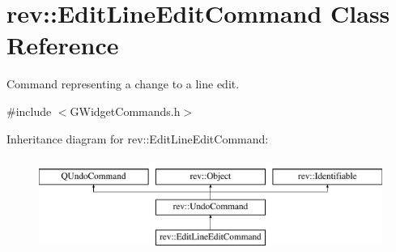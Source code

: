 \hypertarget{classrev_1_1_edit_line_edit_command}{}\section{rev\+::Edit\+Line\+Edit\+Command Class Reference}
\label{classrev_1_1_edit_line_edit_command}


Command representing a change to a line edit.  




{\ttfamily \#include $<$G\+Widget\+Commands.\+h$>$}

Inheritance diagram for rev\+::Edit\+Line\+Edit\+Command\+:\begin{figure}[H]
\begin{center}
\leavevmode
\includegraphics[height=3.000000cm]{classrev_1_1_edit_line_edit_command}
\end{center}
\end{figure}
